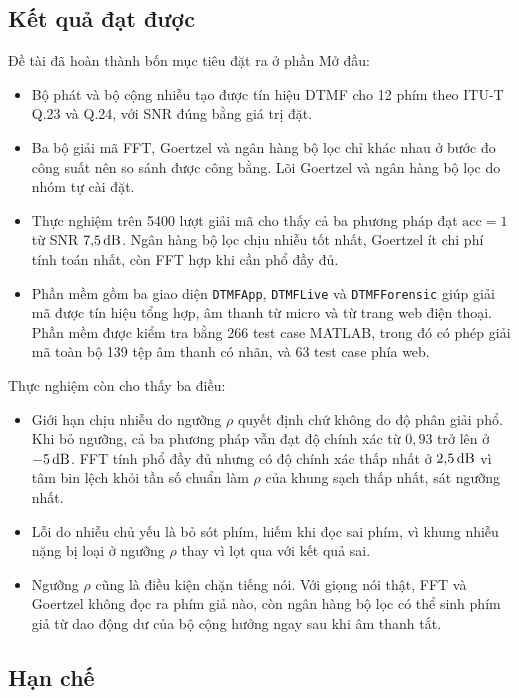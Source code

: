 \documentclass{dtmf_report}
\begin{document}
\subsection{Kết quả đạt được}

Đề tài đã hoàn thành bốn mục tiêu đặt ra ở phần Mở đầu:
\begin{itemize}
  \item Bộ phát và bộ cộng nhiễu tạo được tín hiệu DTMF cho 12 phím theo \mbox{ITU-T}
        Q.23 và Q.24, với SNR đúng bằng giá trị đặt.
  \item Ba bộ giải mã FFT, Goertzel và ngân hàng bộ lọc chỉ khác nhau ở bước đo
        công suất nên so sánh được công bằng. Lõi Goertzel và ngân hàng bộ
        lọc do nhóm tự cài đặt.
  \item Thực nghiệm trên 5400 lượt giải mã cho thấy cả ba phương pháp đạt
        $\mathrm{acc} = 1$ từ SNR $7{,}5\,\mathrm{dB}$. Ngân hàng bộ lọc chịu nhiễu tốt nhất,
        Goertzel ít chi phí tính toán nhất, còn FFT hợp khi cần phổ đầy đủ.
  \item Phần mềm gồm ba giao diện \texttt{DTMFApp}, \texttt{DTMFLive} và
        \texttt{DTMFForensic} giúp giải mã được tín hiệu tổng hợp, âm thanh từ micro và từ
        trang web điện thoại. Phần mềm được kiểm tra bằng 266 test case MATLAB, trong
        đó có phép giải mã toàn bộ 139 tệp âm thanh có nhãn, và 63 test case phía web.
\end{itemize}

Thực nghiệm còn cho thấy ba điều:
\begin{itemize}
  \item Giới hạn chịu nhiễu do ngưỡng $\rho$ quyết định chứ không do độ phân giải
        phổ. Khi bỏ ngưỡng, cả ba phương pháp vẫn đạt độ chính xác từ
        $0{,}93$ trở lên ở $-5\,\mathrm{dB}$. FFT tính phổ đầy đủ nhưng có độ chính xác thấp nhất
        ở $2{,}5\,\mathrm{dB}$ vì tâm bin lệch khỏi tần số chuẩn làm $\rho$ của khung sạch thấp
        nhất, sát ngưỡng nhất.
  \item Lỗi do nhiễu chủ yếu là bỏ sót phím, hiếm khi đọc sai phím, vì khung nhiễu
        nặng bị loại ở ngưỡng $\rho$ thay vì lọt qua với kết quả sai.
  \item Ngưỡng $\rho$ cũng là điều kiện chặn tiếng nói. Với giọng nói thật, FFT và
        Goertzel không đọc ra phím giả nào, còn ngân hàng bộ lọc có thể sinh phím giả
        từ dao động dư của bộ cộng hưởng ngay sau khi âm thanh tắt.
\end{itemize}

\subsection{Hạn chế}
\end{document}
